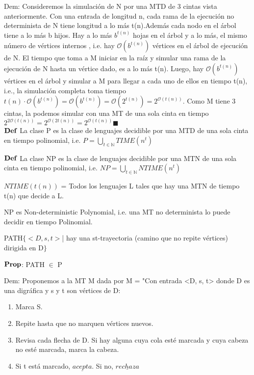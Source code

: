 \documentclass{homework}
\begin{document}
Dem: Consideremos la simulación de N por una MTD de 3 cintas vista anteriormente. Con una entrada de longitud n, cada rama de la ejecución no determinista de N tiene longitud a lo más t(n).Además cada nodo en el árbol tiene a lo más b hijos. Hay a lo más $b^{t(n)}$ hojas en el árbol y a lo más, el mismo número de vértices internos , i.e. hay $\mathcal{O}(b^{t(n)})$ vértices en el árbol de ejecución de N.
El tiempo que toma a M iniciar en la raíz y simular una rama de la ejecución de N hasta un vértice dado, es a lo más t(n).
Luego, hay $\mathcal{O}(b^{t(n)})$ vértices en el árbol y simular a M para llegar a cada uno de ellos en tiempo t(n), i.e., la simulación completa toma tiempo $t(n) \cdot \mathcal{O}(b^{t(n)}) = \mathcal{O}(b^{t(n)}) = \mathcal{O}(2^{t(n)}) = 2^{\mathcal{O}(t(n))}$. Como M tiene 3 cintas, la podemos simular con una MT de una sola cinta en tiempo $2^{2\mathcal{O}(t(n))} = 2^{\mathcal{O}(2 t(n))} = 2^{\mathcal{O}(t(n))}\blacksquare$\\


$\bf{Def}$ La clase P es la clase de lenguajes decidible por una MTD de una sola cinta en tiempo polinomial, i.e. $P = \bigcup_{t \in \mathds{N}} TIME(n^t)$

$\bf{Def}$ La clase NP es la clase de lenguajes decidible por una MTN de una sola cinta en tiempo polinomial, i.e. $NP = \bigcup_{t \in \mathds{N}} NTIME(n^t)$

$NTIME(t(n))$ = Todos los lenguajes L tales que hay una MTN de tiempo t(n) que decide a L.

NP es Non-deterministic Polynomial, i.e. una MT no determinista lo puede decidir en tiempo Polinomial.

PATH$\{ < D, s, t >$| hay una st-trayectoria (camino que no repite vértices) dirigida en D$\}$

$\bf{Prop}$: PATH $\in$ P

Dem: Proponemos a la MT M dada por 
M = "Con entrada <D, s, t> donde D es una digráfica y s y t son vértices de D:
\begin{enumerate}
	\item Marca S.
	\item Repite hasta que no marquen vértices nuevos.
	\item  Revisa cada flecha de D. Si hay alguna cuya cola esté marcada y cuya cabeza no esté marcada, marca la cabeza.
	\item Si t está marcado, $\underline{acepta}$. Si no, $\underline{rechaza}$
\end{enumerate}
\end{document}
